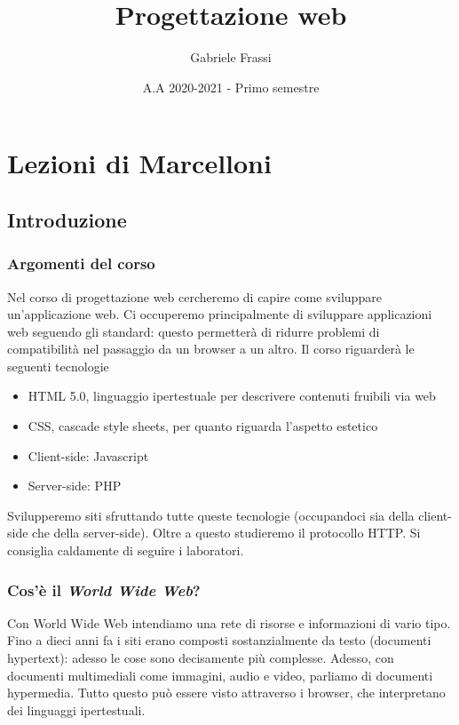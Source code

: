 \documentclass[11pt]{report}
\begin{document}
\renewcommand{\contentsname}{Indice degli appunti}
\title{\textbf{Progettazione web}}
\author{Gabriele Frassi}
\date{A.A 2020-2021 - Primo semestre\doclicenseThis}
\maketitle

\small\tableofcontents\normalsize

\part{Lezioni di Marcelloni}
\chapter{Introduzione}
\section*{Argomenti del corso}
Nel corso di progettazione web cercheremo di capire come sviluppare un'applicazione web. Ci occuperemo principalmente di sviluppare applicazioni web seguendo gli standard: questo permetterà di ridurre problemi di compatibilità nel passaggio da un browser a un altro. Il corso riguarderà le seguenti tecnologie
\begin{itemize}
\item HTML 5.0, linguaggio ipertestuale per descrivere contenuti fruibili via web
\item CSS, cascade style sheets, per quanto riguarda l'aspetto estetico
\item Client-side: Javascript
\item Server-side: PHP
\end{itemize}
Svilupperemo siti sfruttando tutte queste tecnologie (occupandoci sia della client-side che della server-side). Oltre a questo studieremo il protocollo HTTP. Si consiglia caldamente di seguire i laboratori.

\section*{Cos'è il \emph{World Wide Web}?}
Con World Wide Web intendiamo una rete di risorse e informazioni di vario tipo. Fino a dieci anni fa i siti erano composti sostanzialmente da testo (documenti hypertext): adesso le cose sono decisamente più complesse. Adesso, con documenti multimediali come immagini, audio e video, parliamo di documenti hypermedia. Tutto questo può essere visto attraverso i browser, che interpretano dei linguaggi ipertestuali. 
\end{document}
